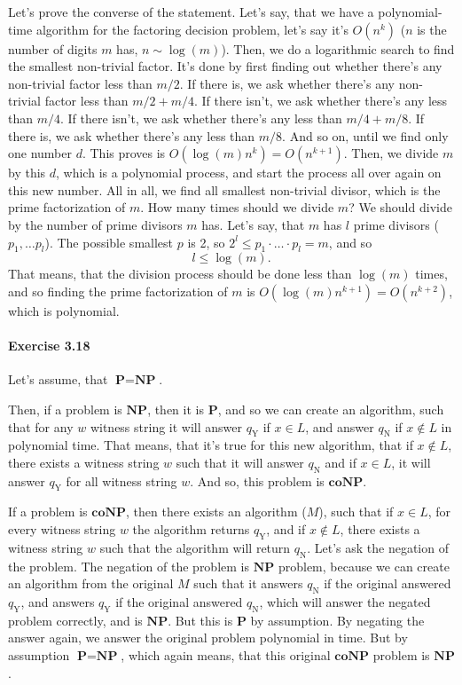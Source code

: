 \documentclass[a4paper,12pt]{article}
\newcommand{\exercise}[1]{\paragraph{Exercise #1}}
\begin{document}
        Let's prove the converse of the statement. Let's say, that we have a polynomial-time algorithm for the factoring decision problem, let's say it's $O(n^k)$ ($n$ is the number of digits $m$ has, $n \sim \log(m)$). Then, we do a logarithmic search to find the smallest non-trivial factor. It's done by first finding out whether there's any non-trivial factor less than $m/2$. If there is, we ask whether there's any non-trivial factor less than $m/2 + m/4$. If there isn't, we ask whether there's any less than $m/4$. If there isn't, we ask whether there's any less than $m/4 + m/8$. If there is, we ask whether there's any less than $m/8$. And so on, until we find only one number $d$. This proves is $O(\log(m) n^k) = O(n^{k+1})$. Then, we divide $m$ by this $d$, which is a polynomial process, and start the process all over again on this new number. All in all, we find all smallest non-trivial divisor, which is the prime factorization of $m$. How many times should we divide $m$? We should divide by the number of prime divisors $m$ has. Let's say, that $m$ has $l$ prime divisors ($p_1, \ldots p_l$). The possible smallest $p$ is 2, so $2^l \leq p_1 \cdot \ldots \cdot p_l = m$, and so
    \begin{equation}
        l \leq \log(m) \textrm{.}
    \end{equation}
    That means, that the division process should be done less than $\log(m)$ times, and so finding the prime factorization of $m$ is $O(\log(m)n^{k+1}) = O(n^{k+2})$, which is polynomial.

    \exercise{3.18} \cite{abrahamson_csci_6420} Let's assume, that $\textbf{P} = \textbf{NP}$.

    Then, if a problem is $\textbf{NP}$, then it is $\textbf{P}$, and so we can create an algorithm, such that for any $w$ witness string it will answer $q_\textrm{Y}$ if $x \in L$, and answer $q_\textrm{N}$ if $x \notin L$ in polynomial time. That means, that it's true for this new algorithm, that if $x \notin L$, there exists a witness string $w$ such that it will answer $q_\textrm{N}$ and if $x \in L$, it will answer $q_\textrm{Y}$ for all witness string $w$. And so, this problem is $\textbf{coNP}$.

    If a problem is $\textbf{coNP}$, then there exists an algorithm ($M$), such that if $x \in L$, for every witness string $w$ the algorithm returns $q_\textrm{Y}$, and if $x \notin L$, there exists a witness string $w$ such that the algorithm will return $q_\textrm{N}$. Let's ask the negation of the problem. The negation of the problem is $\textbf{NP}$ problem, because we can create an algorithm from the original $M$ such that it answers $q_\textrm{N}$ if the original answered $q_\textrm{Y}$, and answers $q_\textrm{Y}$ if the original answered $q_\textrm{N}$, which will answer the negated problem correctly, and is $\textbf{NP}$. But this is $\textbf{P}$ by assumption. By negating the answer again, we answer the original problem polynomial in time. But by assumption $\textbf{P} = \textbf{NP}$, which again means, that this original $\textbf{coNP}$ problem is $\textbf{NP}$.
\end{document}
